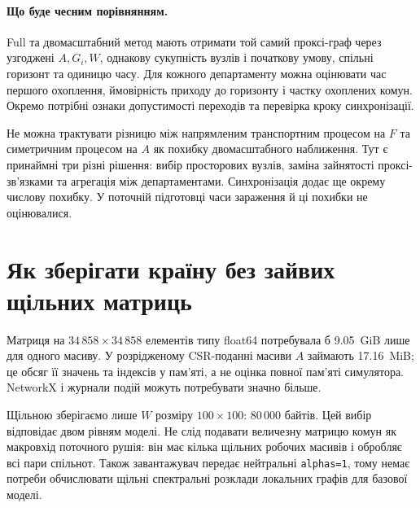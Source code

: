 \documentclass[11pt,a4paper]{article}
\begin{document}
\paragraph{Що буде чесним порівнянням.}
Full та двомасштабний метод мають отримати той самий проксі-граф через узгоджені $A,G_i,W$, однакову сукупність вузлів і початкову умову, спільні горизонт та одиницю часу. Для кожного департаменту можна оцінювати час першого охоплення, ймовірність приходу до горизонту і частку охоплених комун. Окремо потрібні ознаки допустимості переходів та перевірка кроку синхронізації.

Не можна трактувати різницю між напрямленим транспортним процесом на $F$ та симетричним процесом на $A$ як похибку двомасштабного наближення. Тут є принаймні три різні рішення: вибір просторових вузлів, заміна зайнятості проксі-зв'язками та агрегація між департаментами. Синхронізація додає ще окрему числову похибку. У поточній підготовці часи зараження й ці похибки не оцінювалися.

\section{Як зберігати країну без зайвих щільних матриць}
Матриця на $34\,858\times34\,858$ елементів типу float64 потребувала б 9.05~GiB лише для одного масиву. У розрідженому CSR-поданні масиви $A$ займають 17.16~MiB; це обсяг її значень та індексів у пам'яті, а не оцінка повної пам'яті симулятора. NetworkX і журнали подій можуть потребувати значно більше.

Щільною зберігаємо лише $W$ розміру $100\times100$: 80\,000 байтів. Цей вибір відповідає двом рівням моделі. Не слід подавати величезну матрицю комун як макровхід поточного рушія: він має кілька щільних робочих масивів і обробляє всі пари спільнот. Також завантажувач передає нейтральні \texttt{alphas=1}, тому немає потреби обчислювати щільні спектральні розклади локальних графів для базової моделі.
\end{document}
